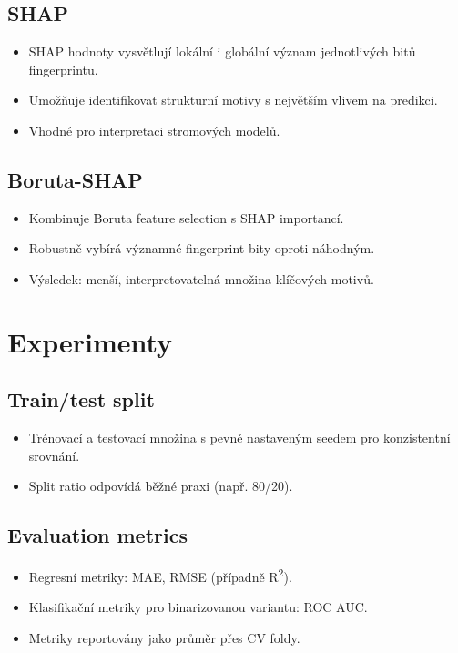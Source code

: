 \documentclass[12pt]{article}
\begin{document}
\subsection{SHAP}
\begin{itemize}
  \item SHAP hodnoty vysvětlují lokální i globální význam jednotlivých bitů fingerprintu.
  \item Umožňuje identifikovat strukturní motivy s největším vlivem na predikci.
  \item Vhodné pro interpretaci stromových modelů.
\end{itemize}
\subsection{Boruta-SHAP}
\begin{itemize}
  \item Kombinuje Boruta feature selection s SHAP importancí.
  \item Robustně vybírá významné fingerprint bity oproti náhodným.
  \item Výsledek: menší, interpretovatelná množina klíčových motivů.
\end{itemize}

\section{Experimenty}
\subsection{Train/test split}
\begin{itemize}
  \item Trénovací a testovací množina s pevně nastaveným seedem pro konzistentní srovnání.
  \item Split ratio odpovídá běžné praxi (např. 80/20).
\end{itemize}
\subsection{Evaluation metrics}
\begin{itemize}
  \item Regresní metriky: MAE, RMSE (případně R\textsuperscript{2}).
  \item Klasifikační metriky pro binarizovanou variantu: ROC AUC.
  \item Metriky reportovány jako průměr přes CV foldy.
\end{itemize}
\end{document}
